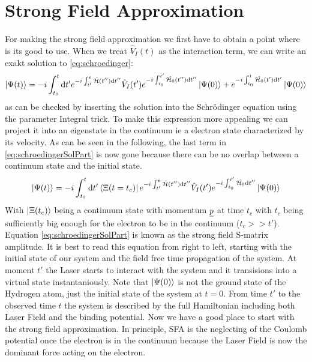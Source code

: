 \newpage
\section{Strong Field Approximation}

For making the strong field approximation we first have to obtain a point where is its good to use. 
When we treat $\hat{V}_I(t)$ as the interaction term, we can write an exakt solution to \eqref{eq:schroedinger}:
\begin{equation}
    \ket{\Psi(t)} = -i \int_{t_0}^{t} \mathrm{d} t' e^{-i \int_{t'}^{t} \hat{\mathcal{H}}(t'') \mathrm{d} t''} \hat{V}_I(t') e^{-i \int_{t_0}^{t'} \hat{\mathcal{H}_0}(t'') \mathrm{d} t''} \ket{\Psi(0)} + e^{-i \int_{t_0}^{t} \hat{\mathcal{H}_0}(t') \mathrm{d} t'} \ket{\Psi(0)} \label{eq:schroedingerSolPart}
\end{equation}
as can be checked by inserting the solution into the Schrödinger equation using the parameter Integral trick. 
To make this expression more appealing we can project it into an eigenstate in the continuum ie a electron state characterized by its velocity.
As can be seen in the following, the last term in \eqref{eq:schroedingerSolPart} is now gone because there can be no overlap between a continuum state and the initial state.
\begin{equation}
    \ket{\Psi(t)} = -i \int_{t_0}^{t} \mathrm{d} t' \bra{\Xi(t=t_c)} e^{-i \int_{t'}^{t} \hat{\mathcal{H}}(t'') \mathrm{d} t''}\hat{V}_I(t') e^{-i \int_{t_0}^{t'} \hat{\mathcal{H}_0} \mathrm{d} t''} \ket{\Psi(0)}
\end{equation}
With $\ket{\Xi(t_c)}$ being a continuum state with momentum $\underline{p}$ at time $t_c$ with $t_c$ being sufficiently big enough for the electron to be in the continuum ($t_c >> t'$). 
Equation \eqref{eq:schroedingerSolPart} is known as the strong field S-matrix amplitude. 
It is best to read this equation from right to left, starting with the initial state of our system and the field free time propagation of the system. 
At moment $t'$ the Laser starts to interact with the system and it transisions into a virtual state instantaniously. 
Note that $\ket{\Psi(0)}$ is not the ground state of the Hydrogen atom, just the initial state of the system at $t=0$.
From time $t'$ to the observed time $t$ the system is described by the full Hamiltonian including both Laser Field and the binding potential.
Now we have a good place to start with the strong field approximation. 
In principle, SFA is the neglecting of the Coulomb potential once the electron is in the continuum because the Laser Field is now the dominant force acting on the electron.
